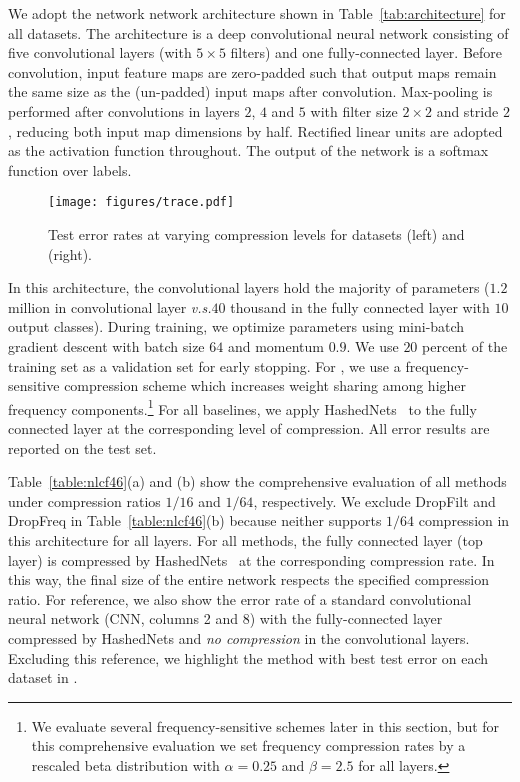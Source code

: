 \documentclass{article} %
\begin{document}
We adopt the network network architecture shown in Table~\ref{tab:architecture} for all datasets.
The architecture is a deep convolutional neural network consisting of five convolutional layers (with $5\times 5$ filters) and one fully-connected layer.
Before convolution, input feature maps are zero-padded such that output maps remain the same size as the (un-padded) input maps after convolution.
Max-pooling is performed after convolutions in layers $2$, $4$ and $5$ with filter size $2\times 2$ and stride $2$, reducing both input map dimensions by half.
Rectified linear units are adopted as the activation function throughout.
The output of the network is a softmax function over labels.

\begin{wrapfigure}{r}{0.63\textwidth}
\vspace{-1ex}
    \texttt{[image: figures/trace.pdf]}
    \vspace{-4ex}
	\caption{Test error rates at varying compression levels for datasets  (left) and  (right).}
    \label{fig:trace}
\end{wrapfigure}
In this architecture, the convolutional layers hold the majority of parameters ($1.2$ million in convolutional layer \emph{v.s.}$40$ thousand in the fully connected layer with $10$ output classes).
During training, we optimize parameters using mini-batch gradient descent with batch size $64$ and momentum $0.9$.
We use $20$ percent of the training set as a validation set for early stopping.
For \abbrev{}, we use a frequency-sensitive compression scheme which increases weight sharing among higher frequency components.\footnote{We evaluate several frequency-sensitive schemes later in this section, but for this comprehensive evaluation we set frequency compression rates by a rescaled beta distribution with $\alpha=0.25$ and $\beta=2.5$ for all layers.}
For all baselines, we apply HashedNets~\cite{chen2015compressing} to the fully connected layer at the corresponding level of compression.
All error results are reported on the test set.

Table~\ref{table:nlcf46}(a) and (b) show the comprehensive evaluation of all methods under compression ratios $1/16$ and $1/64$, respectively.
We exclude DropFilt and DropFreq in Table~\ref{table:nlcf46}(b) because neither supports $1/64$ compression in this architecture for all layers.
For all methods, the fully connected layer (top layer) is compressed by HashedNets~\cite{chen2015compressing} at the corresponding compression rate.
In this way, the final size of the entire network respects the specified compression ratio.
For reference, we also show the error rate of a standard convolutional neural network (CNN, columns 2 and 8) with the fully-connected layer compressed by HashedNets and \emph{no compression} in the convolutional layers.
Excluding this reference, we highlight the method with best test error on each dataset in .
\end{document}
